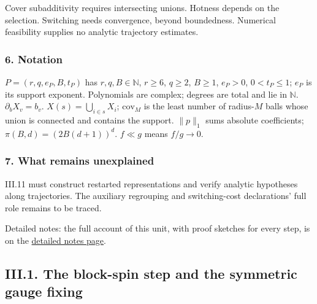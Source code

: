 \documentclass[
  letterpaper,
  11pt]{article}
\begin{document}
Cover subadditivity requires intersecting unions. Hotness depends on the
selection. Switching needs convergence, beyond boundedness. Numerical
feasibility supplies no analytic trajectory estimates.

\subsubsection{6. Notation}\label{notation-2}

\(P=(r,q,e_P,B,t_P)\) has \(r,q,B\in\mathbb N\), \(r\ge6\), \(q\ge2\),
\(B\ge1\), \(e_P>0\), \(0<t_P\le1\); \(e_P\) is its support exponent.
Polynomials are complex; degrees are total and lie in \(\mathbb N\).
\(\partial_bX_v=b_v\). \(X(s)=\bigcup_{i\in s}X_i\); \(\mathrm{cov}_M\)
is the least number of radius-\(M\) balls whose union is connected and
contains the support. \(\|p\|_1\) sums absolute coefficients;
\(\pi(B,d)=(2B(d+1))^d\). \(f\ll g\) means \(f/g\to0\).

\subsubsection{7. What remains
unexplained}\label{what-remains-unexplained-2}

III.11 must construct restarted representations and verify analytic
hypotheses along trajectories. The auxiliary regrouping and
switching-cost declarations' full role remains to be traced.

Detailed notes: the full account of this unit, with proof sketches for
every step, is on the
\href{https://github.com/scottnarmstrong/yang-mills-informalization/blob/main/outline/notes/II-2.md}{detailed
notes page}.

\subsection{III.1. The block-spin step and the symmetric gauge
fixing}\label{iii.1.-the-block-spin-step-and-the-symmetric-gauge-fixing}
\end{document}
